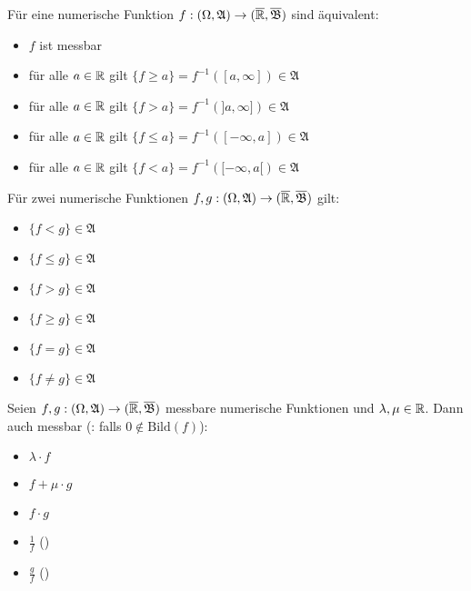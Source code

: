 \documentclass{cheat-sheet}
\newcommand{\ER}{\overline\R} %
\newcommand{\Alg}{\mathfrak{A}}
\newcommand{\Bor}{\mathfrak{B}} %
\begin{document}
\begin{satz}
  Für eine numerische Funktion $f : (\Omega, \Alg) \to (\ER, \overline{\Bor})$ sind äquivalent:
  \begin{itemize}
    \item $f$ ist messbar
    \item für alle $a \in \mathbb{R}$ gilt $\{ f \geq a \} = f^{-1}([a, \infty]) \in \Alg$
    \item für alle $a \in \mathbb{R}$ gilt $\{ f > a \} = f^{-1}(]a, \infty]) \in \Alg$
    \item für alle $a \in \mathbb{R}$ gilt $\{ f \leq a \} = f^{-1}([-\infty, a]) \in \Alg$
    \item für alle $a \in \mathbb{R}$ gilt $\{ f < a \} = f^{-1}([-\infty, a[) \in \Alg$
  \end{itemize}
\end{satz}

\begin{satz}
  Für zwei numerische Funktionen $f, g : (\Omega, \Alg) \to (\ER, \overline{\Bor})$ gilt:
  \begin{multicols}{3}
    \begin{itemize}
      \item $\{ f < g \} \in \Alg$
      \item $\{ f \leq g \} \in \Alg$
      \item $\{ f > g \} \in \Alg$
      \item $\{ f \geq g \} \in \Alg$
      \item $\{ f = g \} \in \Alg$
      \item $\{ f \not= g \} \in \Alg$
    \end{itemize}
  \end{multicols}
\end{satz}

\begin{satz}
  Seien $f, g : (\Omega, \Alg) \to (\ER, \overline{\Bor})$ messbare numerische Funktionen und $\lambda, \mu \in \mathbb{R}$. Dann auch messbar (\ddag: falls $0 \not\in \mathrm{Bild}(f)$):
  \begin{multicols}{5}
    \begin{itemize}
      \item $\lambda \cdot f$
      \item $f + \mu \cdot g$
      \item $f \cdot g$
      \item $\tfrac{1}{f}$ (\ddag)
      \item $\tfrac{g}{f}$ (\ddag)
    \end{itemize}
  \end{multicols}
\end{satz}
\end{document}
